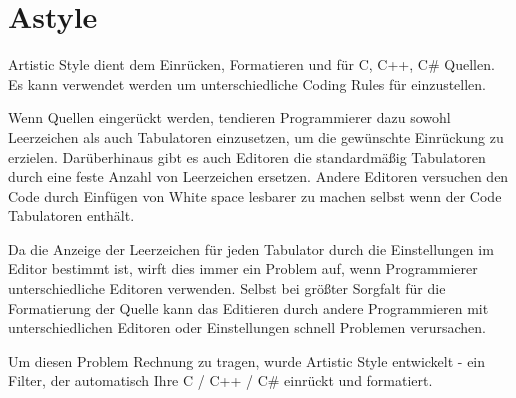 \section{Astyle}\label{sec:astyle}

Artistic Style dient dem Einrücken, Formatieren und  für C, C++, C\# Quellen. Es kann verwendet werden um unterschiedliche Coding Rules für \codeblocks einzustellen.


Wenn Quellen eingerückt werden, tendieren Programmierer dazu sowohl Leerzeichen als auch Tabulatoren einzusetzen, um die gewünschte Einrückung zu erzielen. Darüberhinaus gibt es auch Editoren die standardmäßig Tabulatoren durch eine feste Anzahl von Leerzeichen ersetzen. Andere Editoren versuchen den Code durch Einfügen von White space lesbarer zu machen selbst wenn der Code Tabulatoren enthält.

Da die Anzeige der Leerzeichen für jeden Tabulator durch die Einstellungen im Editor bestimmt ist, wirft dies immer ein Problem auf, wenn Programmierer unterschiedliche Editoren verwenden. Selbst bei größter Sorgfalt für die Formatierung der Quelle kann das Editieren durch andere Programmieren mit unterschiedlichen Editoren oder Einstellungen schnell Problemen verursachen.

Um diesen Problem Rechnung zu tragen, wurde Artistic Style entwickelt - ein Filter, der automatisch Ihre C / C++ / C\# einrückt und formatiert.


